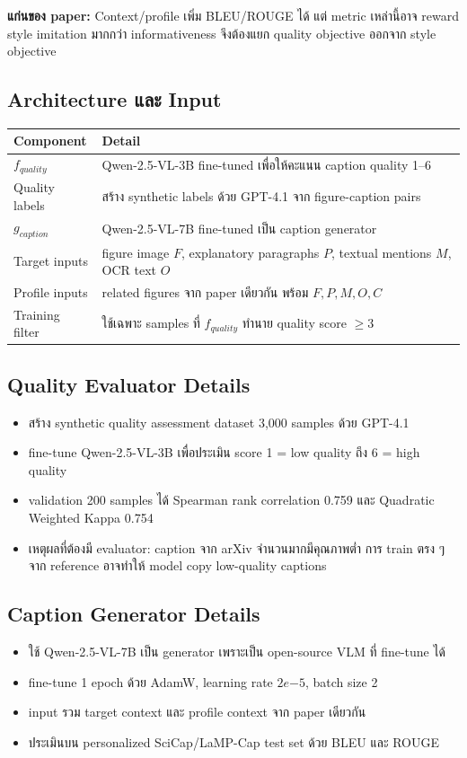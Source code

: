 \documentclass[10pt,a4paper]{article}
\begin{document}
\begin{note}
\textbf{แก่นของ paper:} Context/profile เพิ่ม BLEU/ROUGE ได้ แต่ metric เหล่านี้อาจ reward style imitation มากกว่า informativeness จึงต้องแยก quality objective ออกจาก style objective
\end{note}

\subsection{Architecture และ Input}
\begin{longtable}{@{}L{3.2cm}L{11.4cm}@{}}
\toprule
\textbf{Component} & \textbf{Detail} \\
\midrule
\(f_{quality}\) & Qwen-2.5-VL-3B fine-tuned เพื่อให้คะแนน caption quality 1--6 \\
Quality labels & สร้าง synthetic labels ด้วย GPT-4.1 จาก figure-caption pairs \\
\(g_{caption}\) & Qwen-2.5-VL-7B fine-tuned เป็น caption generator \\
Target inputs & figure image \(F\), explanatory paragraphs \(P\), textual mentions \(M\), OCR text \(O\) \\
Profile inputs & related figures จาก paper เดียวกัน พร้อม \(F, P, M, O, C\) \\
Training filter & ใช้เฉพาะ samples ที่ \(f_{quality}\) ทำนาย quality score \(\geq 3\) \\
\bottomrule
\end{longtable}

\subsection{Quality Evaluator Details}
\begin{itemize}
\item สร้าง synthetic quality assessment dataset 3,000 samples ด้วย GPT-4.1
\item fine-tune Qwen-2.5-VL-3B เพื่อประเมิน score 1 = low quality ถึง 6 = high quality
\item validation 200 samples ได้ Spearman rank correlation 0.759 และ Quadratic Weighted Kappa 0.754
\item เหตุผลที่ต้องมี evaluator: caption จาก arXiv จำนวนมากมีคุณภาพต่ำ การ train ตรง ๆ จาก reference อาจทำให้ model copy low-quality captions
\end{itemize}

\subsection{Caption Generator Details}
\begin{itemize}
\item ใช้ Qwen-2.5-VL-7B เป็น generator เพราะเป็น open-source VLM ที่ fine-tune ได้
\item fine-tune 1 epoch ด้วย AdamW, learning rate \(2e{-5}\), batch size 2
\item input รวม target context และ profile context จาก paper เดียวกัน
\item ประเมินบน personalized SciCap/LaMP-Cap test set ด้วย BLEU และ ROUGE
\end{itemize}
\end{document}
